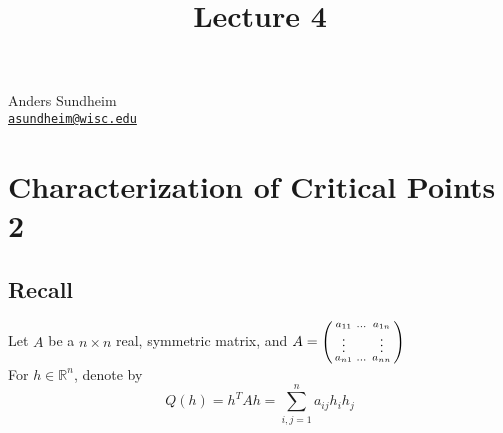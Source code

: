 \documentclass[12pt]{article}
\title{Lecture 4}
\newcommand{\BR}{\mathbb R}
\begin{document}
\maketitle
\vspace*{-0.25in}
\begin{center}
	Anders Sundheim \\
	\href{mailto:asundheim@wisc.edu}{{\tt asundheim@wisc.edu}}
\end{center}
\section*{Characterization of Critical Points 2}
\subsection*{Recall}
Let $A$ be a $n\times n$ real, symmetric matrix, and
$A=\begin{psmallmatrix}
a_{11} & \dots & a_{1n} \\
\vdots & & \vdots \\
a_{n1} & \dots & a_{nn}
\end{psmallmatrix}$ \\
For $h\in\BR^n$, denote by \\
\[ Q(h) = h^TAh=\sum_{i,j=1}^{n}a_{ij}h_ih_j \]
\end{document}
